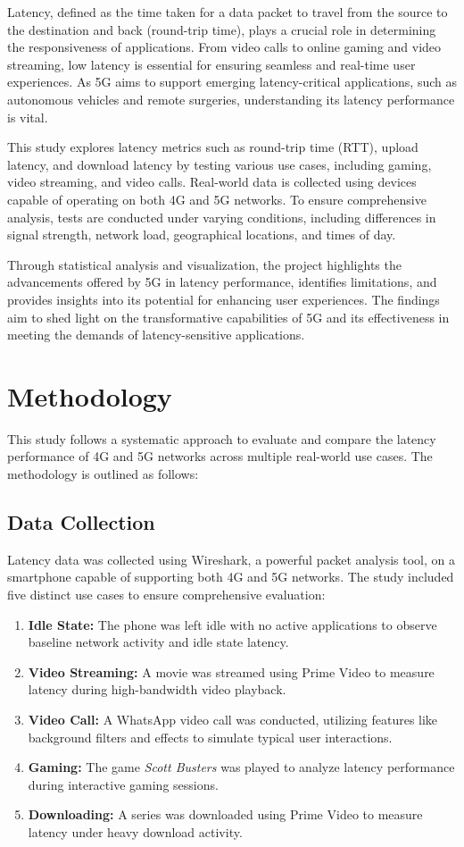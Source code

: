 \documentclass[conference]{IEEEtran}
\begin{document}
Latency, defined as the time taken for a data packet to travel from the source to the destination and back (round-trip time), plays a crucial role in determining the responsiveness of applications. From video calls to online gaming and video streaming, low latency is essential for ensuring seamless and real-time user experiences. As 5G aims to support emerging latency-critical applications, such as autonomous vehicles and remote surgeries, understanding its latency performance is vital.

This study explores latency metrics such as round-trip time (RTT), upload latency, and download latency by testing various use cases, including gaming, video streaming, and video calls. Real-world data is collected using devices capable of operating on both 4G and 5G networks. To ensure comprehensive analysis, tests are conducted under varying conditions, including differences in signal strength, network load, geographical locations, and times of day.

Through statistical analysis and visualization, the project highlights the advancements offered by 5G in latency performance, identifies limitations, and provides insights into its potential for enhancing user experiences. The findings aim to shed light on the transformative capabilities of 5G and its effectiveness in meeting the demands of latency-sensitive applications.

\section{Methodology}
This study follows a systematic approach to evaluate and compare the latency performance of 4G and 5G networks across multiple real-world use cases. The methodology is outlined as follows:

\subsection*{Data Collection}
Latency data was collected using Wireshark, a powerful packet analysis tool, on a smartphone capable of supporting both 4G and 5G networks. The study included five distinct use cases to ensure comprehensive evaluation:
\begin{enumerate}
    \item \textbf{Idle State:} The phone was left idle with no active applications to observe baseline network activity and idle state latency.
    \item \textbf{Video Streaming:} A movie was streamed using Prime Video to measure latency during high-bandwidth video playback.
    \item \textbf{Video Call:} A WhatsApp video call was conducted, utilizing features like background filters and effects to simulate typical user interactions.
    \item \textbf{Gaming:} The game \textit{Scott Busters} was played to analyze latency performance during interactive gaming sessions.
    \item \textbf{Downloading:} A series was downloaded using Prime Video to measure latency under heavy download activity.
\end{enumerate}
\end{document}
